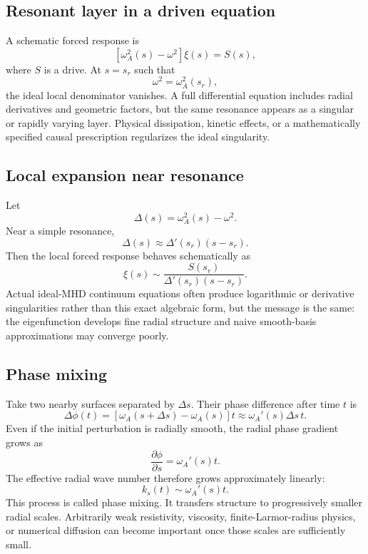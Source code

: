 \subsection{Resonant layer in a driven equation}
A schematic forced response is
\begin{equation}
\left[\omega_A^2(s)-\omega^2\right]\xi(s)=S(s),
\label{eq:forced_local_response}
\end{equation}
where $S$ is a drive. At $s=s_r$ such that
\begin{equation}
\omega^2=\omega_A^2(s_r),
\label{eq:continuum_resonance_condition}
\end{equation}
the ideal local denominator vanishes. A full differential equation includes radial derivatives and geometric factors, but the same resonance appears as a singular or rapidly varying layer. Physical dissipation, kinetic effects, or a mathematically specified causal prescription regularizes the ideal singularity.

\subsection{Local expansion near resonance}
Let
\begin{equation}
\Delta(s)=\omega_A^2(s)-\omega^2.
\end{equation}
Near a simple resonance,
\begin{equation}
\Delta(s)\approx\Delta'(s_r)(s-s_r).
\end{equation}
Then the local forced response behaves schematically as
\begin{equation}
\xi(s)\sim\frac{S(s_r)}{\Delta'(s_r)(s-s_r)}.
\end{equation}
Actual ideal-MHD continuum equations often produce logarithmic or derivative singularities rather than this exact algebraic form, but the message is the same: the eigenfunction develops fine radial structure and naive smooth-basis approximations may converge poorly.

\subsection{Phase mixing}
Take two nearby surfaces separated by $\Delta s$. Their phase difference after time $t$ is
\begin{equation}
\Delta\phi(t)=\left[\omega_A(s+\Delta s)-\omega_A(s)\right]t
\approx\omega_A'(s)\Delta s\,t.
\end{equation}
Even if the initial perturbation is radially smooth, the radial phase gradient grows as
\begin{equation}
\frac{\partial\phi}{\partial s}=\omega_A'(s)t.
\end{equation}
The effective radial wave number therefore grows approximately linearly:
\begin{equation}
k_s(t)\sim\omega_A'(s)t.
\label{eq:phase_mixing_ks}
\end{equation}
This process is called phase mixing. It transfers structure to progressively smaller radial scales. Arbitrarily weak resistivity, viscosity, finite-Larmor-radius physics, or numerical diffusion can become important once those scales are sufficiently small.


